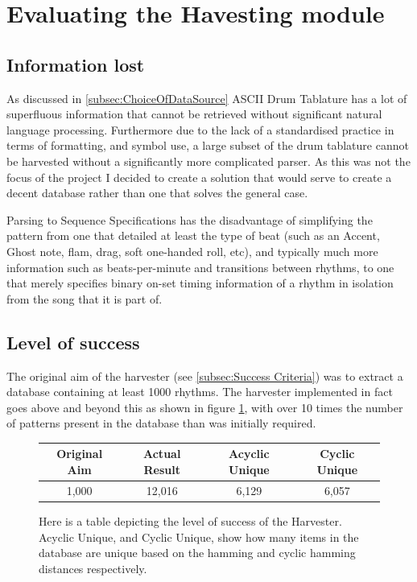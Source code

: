 \documentclass[12pt,twoside,notitlepage]{report}
\begin{document}
	
	
	\section{Evaluating the Havesting module}\label{sec:Eval:Harvester}

			\subsection{Information lost}
					As discussed in \ref{subsec:ChoiceOfDataSource} ASCII Drum Tablature has a lot of superfluous information that cannot be retrieved without significant natural language processing. Furthermore due to the lack of a standardised practice in terms of formatting, and symbol use, a large subset of the drum tablature cannot be harvested without a significantly more complicated parser. As this was not the focus of the project I decided to create a solution that would serve to create a decent database rather than one that solves the general case.
					
					Parsing to Sequence Specifications has the disadvantage of simplifying the pattern from one that detailed at least the type of beat (such as an Accent, Ghost note, flam, drag, soft one-handed roll, etc), and typically much more information such as beats-per-minute and transitions between rhythms, to one that merely specifies binary on-set timing information of a rhythm in isolation from the song that it is part of. 
					
					
					\subsection{Level of success}
					The original aim of the harvester (see \ref{subsec:Success Criteria}) was to extract a database containing at least 1000 rhythms. The harvester implemented in fact goes above and beyond this as shown in figure \ref{tab:Parser analysis}, with over 10 times the number of patterns present in the database than was initially required.
					
					\begin{figure}[]
						\begin{center}
							\begin{tabular}{||c c c c||}
							\hline
							 Original Aim & Actual Result & Acyclic Unique & Cyclic Unique \\ [0.5ex]
							 \hline\hline
							 1,000 & 12,016 & 6,129 & 6,057 \\
							 \hline
							 \end{tabular}
						\end{center}
						\caption{\label{tab:Parser analysis} Here is a table depicting the level of success of the Harvester. Acyclic Unique, and Cyclic Unique, show how many items in the database are unique based on the hamming and cyclic hamming distances respectively.}
							 
\end{figure}			
\end{document}
